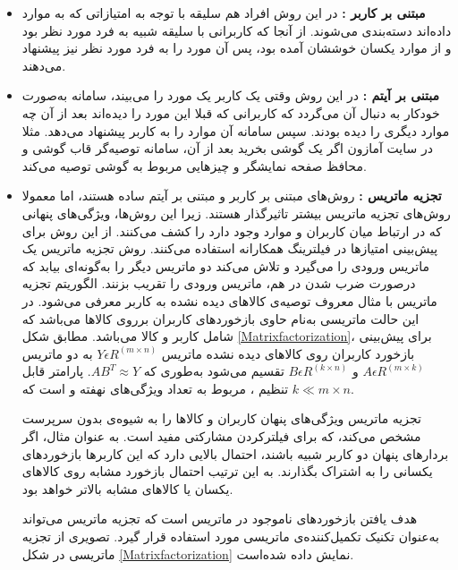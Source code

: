 \begin{itemize}
\item \textbf{مبتنی بر کاربر :}
در این روش افراد هم سلیقه با توجه به امتیازاتی که به موارد داده‌اند دسته‌بندی می‌شوند. از آنجا که کاربرانی با سلیقه شبیه به فرد مورد نظر بود و از  موارد یکسان خوششان آمده بود، پس آن مورد را به فرد مورد نظر نیز پیشنهاد می‌دهند.
\item \textbf{مبتنی بر آیتم :}
در این روش وقتی یک کاربر یک مورد را می‌بیند، سامانه به‌صورت خودکار به دنبال آن می‌گردد که کاربرانی که قبلا این مورد را دیده‌اند بعد از آن چه موارد دیگری را دیده بودند. سپس سامانه آن موارد را به کاربر پیشنهاد می‌دهد. مثلا در سایت آمازون اگر یک گوشی بخرید بعد از آن، سامانه توصیه‌گر قاب گوشی و محافظ صفحه نمایشگر و چیزهایی مربوط به گوشی توصیه می‌کند.
\item \textbf{
تجزیه ماتریس
:\label{MatFactor}}
روش‌های مبتنی بر کاربر و مبتنی بر آیتم ساده هستند، اما معمولا روش‌های تجزیه ماتریس بیشتر تاثیرگذار هستند. زیرا این روش‌ها، ویژگی‌های پنهانی که در ارتباط میان کاربران و موارد وجود دارد را کشف می‌کنند. از این روش برای پیش‌بینی امتیازها در فیلترینگ همکارانه استفاده می‌کنند.
روش تجزیه ماتریس یک ماتریس ورودی را می‌گیرد و تلاش می‌کند دو ماتریس دیگر را به‌گونه‌ای بیابد که درصورت ضرب شدن در هم، ماتریس ورودی را تقریب بزنند. الگوریتم تجزیه ماتریس با مثال معروف توصیه‌ی کالاهای دیده نشده به کاربر معرفی می‌شود. در این حالت ماتریسی به‌نام
حاوی بازخوردهای کاربران برروی کالاها می‌باشد که شامل
کاربر و
کالا می‌باشد. مطابق شکل
\ref{Matrixfactorization}،
برای پیش‌بینی بازخورد کاربران روی کالاهای دیده ‌نشده ماتریس
$Y\epsilon R^{(m \times n)}$
به دو ماتریس
$A\epsilon R^{(m \times k)}$
و
$B\epsilon R^{(k \times n)}$
تقسیم می‌شود به‌طوری که
$ AB^T \approx Y$.
پارامتر قابل تنظیم
،
مربوط به تعداد ویژگی‌های نهفته
 و 
است كه
$k\ll m \times n$.

تجزیه ماتریس ویژگی‌های پنهان کاربران و کالاها را به شیوه‌ی بدون سرپرست مشخص می‌كند، كه برای فیلتركردن مشاركتی مفید است. به عنوان مثال، اگر بردارهای پنهان دو کاربر شبیه باشند، احتمال بالایی دارد که این کاربرها بازخوردهای یکسانی را به اشتراک بگذارند. به این ترتیب احتمال بازخورد مشابه روی کالاهای یکسان یا کالاهای مشابه بالاتر خواهد بود.

هدف يافتن بازخوردهای ناموجود در ماتریس
است كه تجزیه ماتریس می‌تواند به‌عنوان تکنیک تکمیل‌کننده‌ی ماتریسی مورد استفاده قرار گیرد. تصویری از تجزیه ماتریسی در شکل
\ref{Matrixfactorization}
نمایش داده شده‌است.


\end{itemize}
